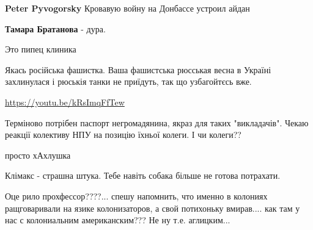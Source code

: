 \begin{itemize}

\textbf{Peter Pyvogorsky} Кровавую войну на Донбассе устроил айдан


\textbf{Тамара Братанова} - дура.
\end{itemize}


Это пипец клиника


Якась російська фашистка. Ваша фашистська рюсськая весна в Україні захлинулася
і рюськія танки не приїдуть, так що узбагойтєсь вже.


\url{https://youtu.be/kRsImqFfTew}


Терміново потрібен паспорт негромадянина, якраз для таких "викладачів". Чекаю реакції колективу НПУ на позицію їхньої колеги. І чи колеги??


просто хАхлушка


Клімакс - страшна штука. Тебе навіть собака більше не готова потрахати.



Оце рило прохфессор????... спешу напомнить, что именно в колониях ращговаривали
на язике колонизаторов, а свой потихоньку вмирав.... как там у нас с
колониальним американским??? Не ну т.е. аглицким...


